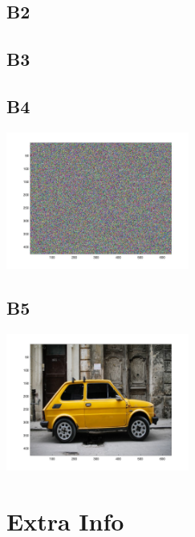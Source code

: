 \documentclass[12pt, letterpaper, titlepage, hidelinks]{article}
\begin{document}
		\subsection{B2}

		\subsection{B3}

		\subsection{B4}
			\includegraphics[width=0.45\textwidth]{encrypted_image}
		\subsection{B5}
			\includegraphics[width=0.45\textwidth]{decrypted_image}

\section{Extra Info}
	
	
	
\end{document}
